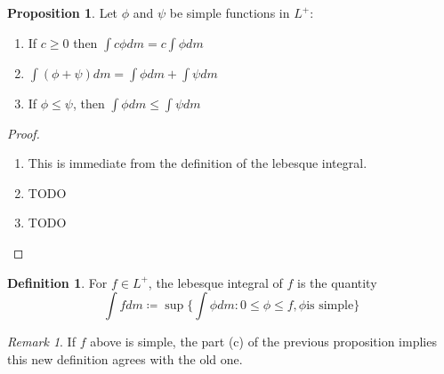 \documentclass{article}
\theoremstyle{definition}
\newtheorem{definition}{Definition}[section]
\newtheorem{prop}{Proposition}[section]
\theoremstyle{remark}
\newtheorem*{remark}{Remark}
\theoremstyle{remark}
\begin{document}
\begin{prop}
Let $\phi$ and $\psi$ be simple functions in $L^{+}$: \begin{enumerate}
\item If $c \geq 0$ then $\int c\phi dm = c\int \phi dm$
\item $\int (\phi + \psi)dm = \int \phi dm + \int \psi dm$
\item If $\phi \leq \psi$, then $\int \phi dm \leq \int \psi dm$
\end{enumerate}
\end{prop}
\begin{proof}
\begin{enumerate}
	\item This is immediate from the definition of the lebesque integral.
	\item TODO
	\item TODO
\end{enumerate}
\end{proof}
\begin{definition}
For $f \in L^{+}$, the lebesque integral of $f$ is the quantity
$$\int f dm \coloneqq \sup \{\int \phi dm : 0 \leq \phi \leq f, \phi \text{is simple}\}$$
\end{definition}
\begin{remark}
If $f$ above is simple, the part (c) of the previous proposition implies this new definition agrees with the old one.
\end{remark}
\end{document}
